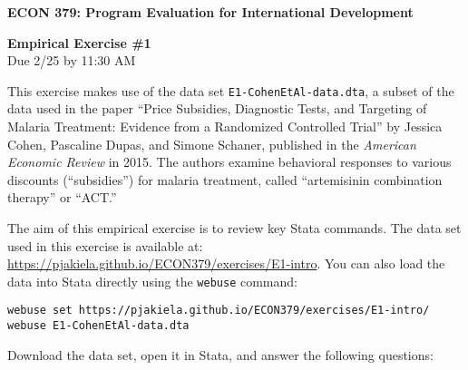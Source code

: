 \documentclass[11pt]{article}
\begin{document}
\begin{center}

\textbf{\large{ECON 379:  Program Evaluation for International Development}} \\

\bigskip

\textbf{\large{Empirical Exercise \#1}} \\ 
Due 2/25 by 11:30 AM 

\end{center}

\bigskip

\bigskip

This exercise makes use of the data set \texttt{E1-CohenEtAl-data.dta}, 
a subset of the data used in the paper ``Price Subsidies, 
Diagnostic Tests, and Targeting of Malaria Treatment: Evidence from a 
Randomized Controlled Trial'' by Jessica Cohen, Pascaline Dupas, and Simone 
Schaner, published in the \emph{American Economic Review} in 2015. 
The authors examine behavioral responses to various discounts (``subsidies'') 
for malaria treatment, called ``artemisinin combination therapy'' 
or ``ACT.''  

\bigskip

The aim of this empirical exercise is to review key Stata commands.
The data set used in this exercise is available at:  
\url{https://pjakiela.github.io/ECON379/exercises/E1-intro}.  You can 
also load the data into Stata directly using the \texttt{webuse} command:

\begin{verbatim}
webuse set https://pjakiela.github.io/ECON379/exercises/E1-intro/
webuse E1-CohenEtAl-data.dta
\end{verbatim}

\noindent
Download the data set, open it in Stata, and answer the following questions:
\end{document}
